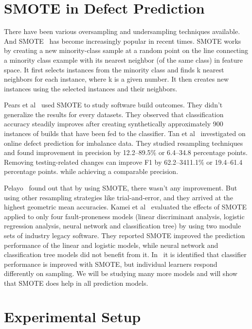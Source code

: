 \documentclass[conference]{IEEEtran}
\begin{document}
\section{SMOTE in Defect Prediction}
\label{smote}
There have been various oversampling and undersampling techniques available. And SMOTE~\cite{chawla2002smote} has become increasingly popular in recent times. SMOTE works by creating a new minority-class sample at a random point on the line connecting a minority class example with its nearest neighbor (of the same class) in feature space. It first selects instances from the minority class and finds k nearest neighbors for each instance, where k is a given number. It then creates new instances using the selected instances and their neighbors. 

Pears et al~\cite{pears2014synthetic} used SMOTE to study software build outcomes. They didn't generalize the results for every datasets. They observed
that classification accuracy steadily improves after creating synthetically approximately 900 instances of builds that have been fed to the classifier. Tan et al~\cite{tan2015online} investigated on online defect prediction for imbalance data. They studied resampling techniques and found improvement in precision by 12.2–89.5\% or 6.4–34.8 percentage points. Removing testing-related changes can improve F1 by 62.2–3411.1\% or 19.4–61.4 percentage points. while achieving a comparable precision.

Pelayo~\cite{pelayo2007applying} found out that by using SMOTE, there wasn't any improvement. But using other resampling strategies like trial-and-error, and they arrived at the highest geometric mean accuracies. Kamei et al~\cite{kamei2007effects} evaluated the effects of SMOTE applied to only four fault-proneness models
(linear discriminant analysis, logistic regression
analysis, neural network and classification tree) by
using two module sets of industry legacy software. They reported SMOTE improved the prediction performance of the linear and logistic models, while neural network and classification tree models did not
benefit from it. In~\cite{van2007experimental} it is identified that classifier performance is improved with SMOTE, but individual learners respond differently on sampling. We will be studying many more models and will show that SMOTE does help in all prediction models.

\section{Experimental Setup}
\label{experiment}
\end{document}
